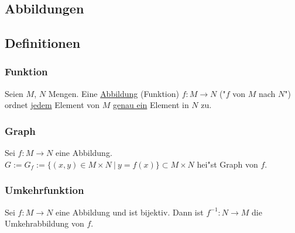 \documentclass[10pt,a4paper,landscape]{article}
\begin{document}
\begin{multicols*}{3}
		\section{Abbildungen}
		\subsection{Definitionen}
		\subsubsection{Funktion}
		Seien $M$, $N$ Mengen. Eine \uline{Abbildung} (Funktion) $f: M \rightarrow N$ ("$f$ von $M$ nach $N$") ordnet \uline{jedem} Element von $M$ \uline{genau ein} Element in $N$ zu.
		
		\subsubsection{Graph}
		Sei $f: M \rightarrow N$ eine Abbildung. $G := G_f := \{(x,y) \in M \times N~|~y = f(x)\} \subset M \times N$ hei"st Graph von $f$.
		
		\subsubsection{Umkehrfunktion}
		Sei $f: M \rightarrow N$ eine Abbildung und ist bijektiv. Dann ist  $f^{-1}: N \rightarrow M$ die Umkehrabbildung von $f$.
		

\end{multicols*}
\end{document}

